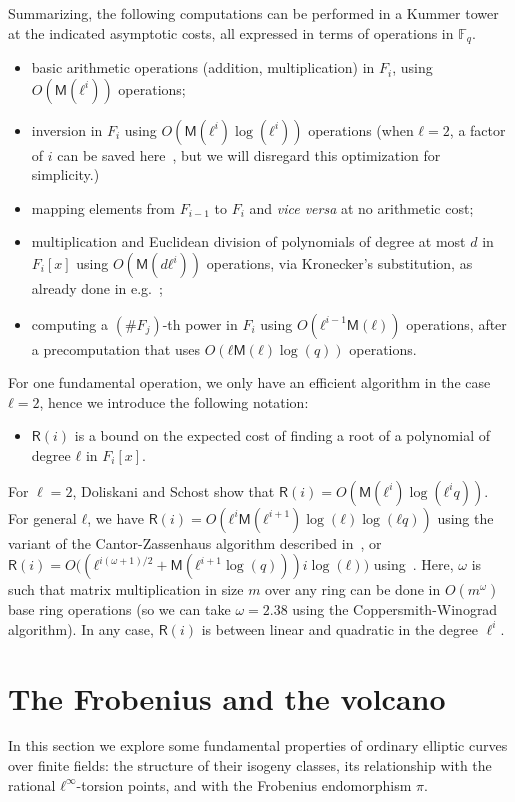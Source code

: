 \documentclass{lms}
\def\cout#1{\mathsf{#1}}
\newcommand{\F}{\mathbb{F}}
\newcommand{\MM}{\cout{M}}
\newcommand{\RR}{\cout{R}}
\begin{document}
Summarizing, the following computations can be performed
in a Kummer tower at the indicated asymptotic costs, all expressed in 
terms of operations in $\F_q$.
\begin{itemize}
\item basic arithmetic operations (addition, multiplication) in $F_i$,
  using $O(\MM(ℓ^i))$ operations;
\item inversion in $F_i$ using $O(\MM(ℓ^i)\log(ℓ^i))$
  operations (when $ℓ=2$, a factor of $i$ can be saved
    here~\cite{DoSc12}, but we will disregard this optimization for
    simplicity.)
\item mapping elements from $F_{i-1}$ to $F_i$ and \emph{vice versa}
  at no arithmetic cost;
\item multiplication and Euclidean division of polynomials of degree
  at most $d$ in $F_i[x]$ using $O(\MM(dℓ^i))$ operations, via
  Kronecker's
  substitution, as already done in e.g.~\cite{vzgathen+shoup92};
\item computing a $(\#F_j)$-th power in $F_i$ using $O(ℓ^{i-1}\MM(ℓ))$
  operations, after a precomputation that uses $O(ℓ\MM(ℓ)\log(q))$
  operations.
\end{itemize}

For one fundamental operation, we only have an efficient algorithm in
the case $ℓ=2$, hence we introduce the following notation:
\begin{itemize}
\item $\RR(i)$ is a bound on the expected cost of finding a root of a polynomial of degree
  $ℓ$ in $F_i[x]$.
\end{itemize}
For $\ell=2$, Doliskani and Schost show that
$\RR(i)=O(\MM(ℓ^i)\log(ℓ^iq))$. For general $ℓ$, we have
$\RR(i)=O(ℓ^i\MM(ℓ^{i+1})\log(ℓ)\log(ℓq))$ using the variant of the
Cantor-Zassenhaus algorithm described in~\cite[Chapter~14.5]{vzGG}, or
$\RR(i)=O\bigl((ℓ^{i(ω+1)/2}+\MM(ℓ^{i+1}\log (q)))i\log(ℓ)\bigr)$
using~\cite{kaltofen+shoup97}. Here, $\omega$ is such that matrix
multiplication in size $m$ over any ring can be done in $O(m^\omega)$
base ring operations (so we can take $\omega =2.38$ using the 
Coppersmith-Winograd algorithm). In any case, $\RR(i)$ is between 
linear and quadratic in the degree $\ell^{i}$.

\section{The Frobenius and the volcano}
\label{sec:isogeny-volcanoes}

In this section we explore some fundamental properties of ordinary
elliptic curves over finite fields: the structure of their isogeny
classes, its relationship with the rational $ℓ^∞$-torsion points, and
with the Frobenius endomorphism $π$.
\end{document}
